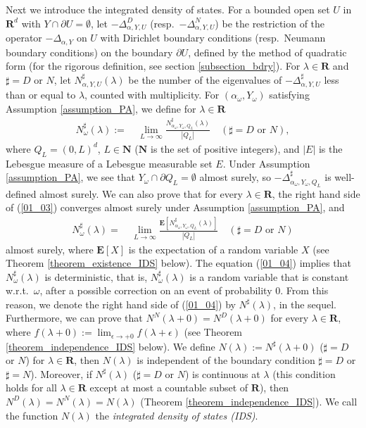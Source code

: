\documentclass[12pt,a4paper]{article}
\begin{document}
Next we introduce the integrated density of states.
For a bounded open set $U$ in $\mathbf{R}^d$
with $Y\cap \partial U=\emptyset$,
let $-\Delta_{\alpha,Y,U}^D$ (resp.\ $-\Delta_{\alpha,Y,U}^N$)
be the restriction of the operator $-\Delta_{\alpha,Y}$ 
on $U$ with Dirichlet boundary conditions 
(resp.\ Neumann boundary conditions) on the boundary $\partial U$,
defined by the method of quadratic form
(for the rigorous definition, see section \ref{subsection_bdry}).
For $\lambda\in \mathbf{R}$ and $\sharp=D$ or $N$,
let $N_{\alpha,Y,U}^\sharp(\lambda)$ 
be the number of the eigenvalues of $-\Delta_{\alpha,Y,U}^\sharp$
less than or equal to $\lambda$, counted with multiplicity.
For $(\alpha_\omega,Y_\omega)$ satisfying Assumption \ref{assumption_PA},
we define for $\lambda\in \mathbf{R}$
\begin{align}
\label{01_03}
 N_\omega^\sharp(\lambda)
:=&\ \lim_{L\to \infty}\frac{N_{\alpha_\omega,Y_\omega, Q_L}^\sharp(\lambda)}{|Q_L|}
\quad(\sharp=D\mbox{ or }N),
\end{align}
where $Q_L=(0,L)^d$, $L\in \mathbf{N}$ 
($\mathbf{N}$ is the set of positive integers),
and 
$|E|$ is the Lebesgue measure of a Lebesgue measurable set $E$.
Under Assumption \ref{assumption_PA},
we see that $Y_\omega \cap \partial Q_L=\emptyset$ almost surely,
so $-\Delta^\sharp_{\alpha_\omega,Y_\omega,Q_L}$ is well-defined almost surely.
We can also prove that for every $\lambda\in \mathbf{R}$, 
the right hand side 
of (\ref{01_03}) converges almost surely under Assumption \ref{assumption_PA},
and 
\begin{align}
\label{01_04}
 N_\omega^\sharp(\lambda)
=&\
 \lim_{L\to \infty}\frac{\mathbf{E}[N_{\alpha_\omega,Y_\omega,Q_L}^\sharp(\lambda)]}{|Q_L|}
\quad(\sharp=D\mbox{ or }N)
\end{align}
almost surely,
where $\mathbf{E}[X]$ is the expectation of a random variable $X$
(see Theorem \ref{theorem_existence_IDS} below).
The equation (\ref{01_04}) implies that
$N^\sharp_\omega(\lambda)$ is 
deterministic,
that is, 
$N^\sharp_\omega(\lambda)$ is a random variable
that is constant w.r.t.\ $\omega$,
after a possible correction on an event of probability $0$.
From this reason, 
we denote the right hand side of (\ref{01_04}) by $N^\sharp(\lambda)$,
in the sequel.
Furthermore, we can prove that 
$N^N(\lambda+0)= N^D(\lambda+0)$
for every $\lambda\in \mathbf{R}$,
where $f(\lambda+ 0):=\lim_{\epsilon\to +0}f(\lambda+\epsilon)$
(see Theorem \ref{theorem_independence_IDS} below). 
We define $N(\lambda):= N^\sharp(\lambda+0)$ ($\sharp=D$ or $N$)
for $\lambda\in \mathbf{R}$,
then $N(\lambda)$ is independent of the boundary condition
$\sharp=D$ or $\sharp=N$).
Moreover, 
if $N^\sharp(\lambda)$ ($\sharp=D$ or $N$)
is continuous at $\lambda$
(this condition holds for all $\lambda\in \mathbf{R}$
except at most a countable subset of $\mathbf{R}$),
then $N^D(\lambda)=N^N(\lambda)=N(\lambda)$
(Theorem \ref{theorem_independence_IDS}). 
We call the function $N(\lambda)$ the 
\textit{integrated density of states (IDS)}.
\end{document}
